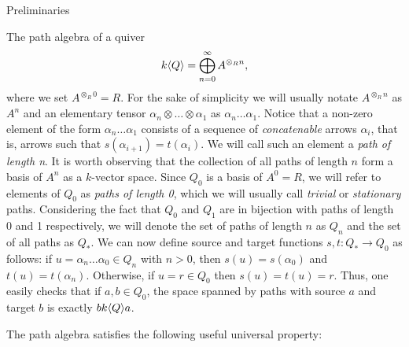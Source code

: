 \begin{chapter}{Preliminaries}
\begin{section}{The path algebra of a quiver}
\[
k\langle Q\rangle = \bigoplus_{n=0}^\infty A^{\otimes_R n},
\]
where we set $A^{\otimes_R 0}=R$. For the sake of simplicity we will usually notate $A^{\otimes_R n}$ as $A^n$ and an elementary tensor $\alpha_n\otimes\dots\otimes \alpha_1$ as $\alpha_n\dots\alpha_1$. Notice that a non-zero element of the form $\alpha_n\dots\alpha_1$ consists of a sequence of \emph{concatenable} arrows $\alpha_i$, that is, arrows such that $s(\alpha_{i+1})=t(\alpha_i)$. We will call such an element a \emph{path of length n}. It is worth observing that the collection of all paths of length $n$ form a basis of $A^n$ as a $k$-vector space. Since $Q_0$ is a basis of $A^0=R$, we will refer to elements of $Q_0$ as \emph{paths of length 0}, which we will usually call \emph{trivial} or \emph{stationary} paths. Considering the fact that $Q_0$ and $Q_1$ are in bijection with paths of length 0 and 1 respectively, we will denote the set of paths of length $n$ as $Q_n$ and the set of all paths as $Q_*$. We can now define source and target functions $s,t:Q_*\to Q_0$ as follows: if $u=\alpha_n\dots\alpha_0\in Q_n$ with $n>0$, then $s(u)=s(\alpha_0)$ and $t(u)=t(\alpha_n)$. Otherwise, if $u=r\in Q_0$ then $s(u)=t(u)=r$. Thus, one easily checks that if $a,b\in Q_0$, the space spanned by paths with source $a$ and target $b$ is exactly $bk\langle Q\rangle a$.

The path algebra satisfies the following useful universal property:


\end{section}
\end{chapter}
